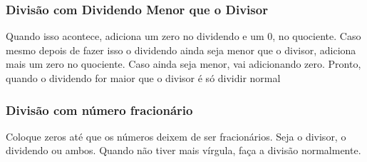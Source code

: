 \documentclass{article}
\begin{document}
\subsubsection{Divisão com Dividendo Menor que o Divisor}
Quando isso acontece, adiciona um zero no dividendo e um 0, no quociente. Caso mesmo depois de fazer isso o dividendo ainda seja menor que o divisor, adiciona mais um zero no quociente. Caso ainda seja menor, vai adicionando zero. Pronto, quando o dividendo for maior que o divisor é só dividir normal

\subsubsection{Divisão com número fracionário}
Coloque zeros até que os números deixem de ser fracionários. Seja o divisor, o dividendo ou ambos. Quando não tiver mais vírgula, faça a divisão normalmente.
\end{document}
